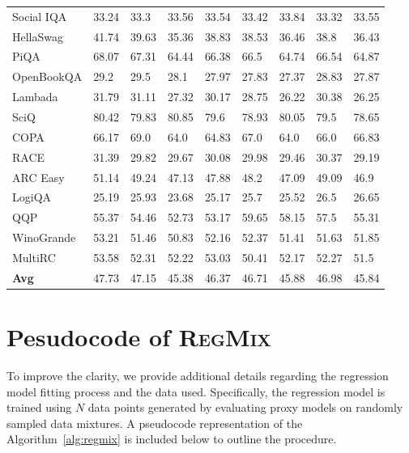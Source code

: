 \documentclass{article}
\theoremstyle{definition}
\theoremstyle{remark}
\newcommand{\ourmethod}{\textsc{RegMix}\xspace}
\begin{document}
\begin{table}[!ht]
\begin{tabular}{lllllllll}
        Social IQA & 33.24 & 33.3 & 33.56 & 33.54 & 33.42 & 33.84 & 33.32 & 33.55 \\ 
        HellaSwag & 41.74 & 39.63 & 35.36 & 38.83 & 38.53 & 36.46 & 38.8 & 36.43 \\ 
        PiQA & 68.07 & 67.31 & 64.44 & 66.38 & 66.5 & 64.74 & 66.54 & 64.87 \\ 
        OpenBookQA & 29.2 & 29.5 & 28.1 & 27.97 & 27.83 & 27.37 & 28.83 & 27.87 \\ 
        Lambada & 31.79 & 31.11 & 27.32 & 30.17 & 28.75 & 26.22 & 30.38 & 26.25 \\ 
        SciQ & 80.42 & 79.83 & 80.85 & 79.6 & 78.93 & 80.05 & 79.5 & 78.65 \\ 
        COPA & 66.17 & 69.0 & 64.0 & 64.83 & 67.0 & 64.0 & 66.0 & 66.83 \\ 
        RACE & 31.39 & 29.82 & 29.67 & 30.08 & 29.98 & 29.46 & 30.37 & 29.19 \\ 
        ARC Easy & 51.14 & 49.24 & 47.13 & 47.88 & 48.2 & 47.09 & 49.09 & 46.9 \\ 
        LogiQA & 25.19 & 25.93 & 23.68 & 25.17 & 25.7 & 25.52 & 26.5 & 26.65 \\ 
        QQP & 55.37 & 54.46 & 52.73 & 53.17 & 59.65 & 58.15 & 57.5 & 55.31 \\ 
        WinoGrande & 53.21 & 51.46 & 50.83 & 52.16 & 52.37 & 51.41 & 51.63 & 51.85 \\ 
        MultiRC & 53.58 & 52.31 & 52.22 & 53.03 & 50.41 & 52.17 & 52.27 & 51.5 \\ 
        \midrule
        \textbf{Avg} & 47.73 & 47.15 & 45.38 & 46.37 & 46.71 & 45.88 & 46.98 & 45.84 \\ \bottomrule
    \end{tabular}
\end{table}

\section{Pesudocode of \ourmethod}

To improve the clarity, we provide additional details regarding the regression model fitting process and the data used. Specifically, the regression model is trained using $N$ data points generated by evaluating proxy models on randomly sampled data mixtures. 
A pseudocode representation of the Algorithm~\ref{alg:regmix} is included below to outline the procedure.
\end{document}
